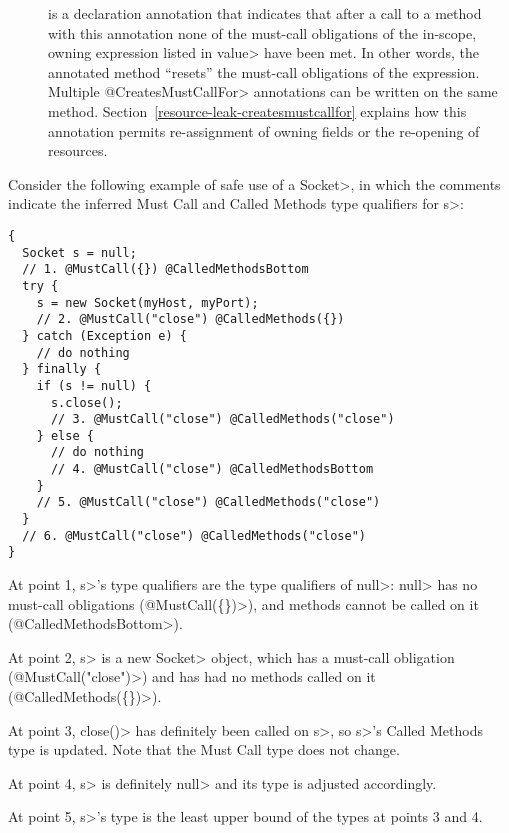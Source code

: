 \begin{description}

\item[]
  is a declaration annotation that indicates that after a call to a method
  with this annotation none of the must-call obligations of the in-scope, owning expression
  listed in \<value> have been met.
  In other words, the annotated method ``resets'' the must-call obligations of the expression.
  Multiple \<@CreatesMustCallFor>
  annotations can be written on the same method.  Section~\ref{resource-leak-createsmustcallfor}
  explains how this annotation permits re-assignment of owning
  fields or the re-opening of resources.

\end{description}



Consider the following example of safe use of a \<Socket>, in which the comments indicate the
inferred Must Call and Called Methods type qualifiers for \<s>:
\begin{verbatim}
{
  Socket s = null;
  // 1. @MustCall({}) @CalledMethodsBottom
  try {
    s = new Socket(myHost, myPort);
    // 2. @MustCall("close") @CalledMethods({})
  } catch (Exception e) {
    // do nothing
  } finally {
    if (s != null) {
      s.close();
      // 3. @MustCall("close") @CalledMethods("close")
    } else {
      // do nothing
      // 4. @MustCall("close") @CalledMethodsBottom
    }
    // 5. @MustCall("close") @CalledMethods("close")
  }
  // 6. @MustCall("close") @CalledMethods("close")
}
\end{verbatim}

At point 1, \<s>'s type qualifiers are the type qualifiers of \<null>:
\<null> has no must-call obligations (\<@MustCall(\{\})>),
and methods cannot be called on it (\<@CalledMethodsBottom>).

At point 2, \<s> is a new \<Socket> object, which
has a must-call obligation (\<@MustCall("close")>)
and has had no methods called on it (\<@CalledMethods(\{\})>).

At point 3, \<close()> has definitely been called on \<s>, so
\<s>'s Called Methods type is updated. Note that the Must Call type
does not change.

At point 4, \<s> is definitely \<null> and its type is adjusted accordingly.

At point 5, \<s>'s type is the least upper bound of the types at points 3
and 4.

